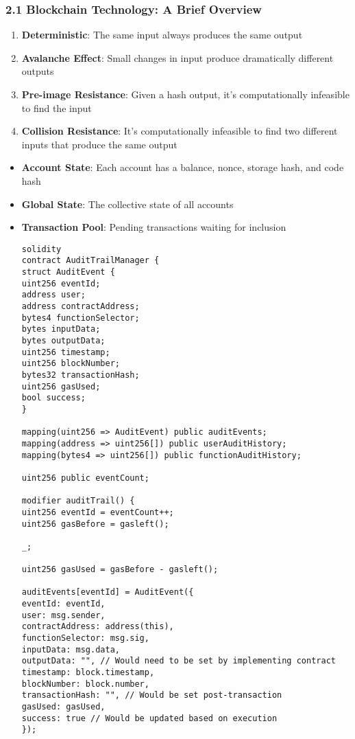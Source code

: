 \documentclass[12pt]{article}
\begin{document}
{{{\subsubsection{2.1 Blockchain Technology: A Brief Overview} %
\begin{enumerate}
	\item \textbf{Deterministic}: The same input always produces the same output
	\item \textbf{Avalanche Effect}: Small changes in input produce dramatically different outputs
	\item \textbf{Pre-image Resistance}: Given a hash output, it's computationally infeasible to find the input
	\item \textbf{Collision Resistance}: It's computationally infeasible to find two different inputs that produce the same output

\end{enumerate}
\begin{itemize}
	\item \textbf{Account State}: Each account has a balance, nonce, storage hash, and code hash
	\item \textbf{Global State}: The collective state of all accounts
	\item \textbf{Transaction Pool}: Pending transactions waiting for inclusion

\begin{lstlisting}
solidity
contract AuditTrailManager {
struct AuditEvent {
uint256 eventId;
address user;
address contractAddress;
bytes4 functionSelector;
bytes inputData;
bytes outputData;
uint256 timestamp;
uint256 blockNumber;
bytes32 transactionHash;
uint256 gasUsed;
bool success;
}

mapping(uint256 => AuditEvent) public auditEvents;
mapping(address => uint256[]) public userAuditHistory;
mapping(bytes4 => uint256[]) public functionAuditHistory;

uint256 public eventCount;

modifier auditTrail() {
uint256 eventId = eventCount++;
uint256 gasBefore = gasleft();

_;

uint256 gasUsed = gasBefore - gasleft();

auditEvents[eventId] = AuditEvent({
eventId: eventId,
user: msg.sender,
contractAddress: address(this),
functionSelector: msg.sig,
inputData: msg.data,
outputData: "", // Would need to be set by implementing contract
timestamp: block.timestamp,
blockNumber: block.number,
transactionHash: "", // Would be set post-transaction
gasUsed: gasUsed,
success: true // Would be updated based on execution
});


\end{lstlisting}
\end{itemize}}}}
\end{document}
